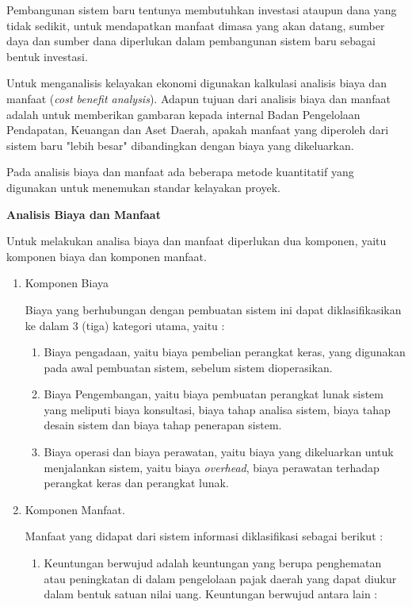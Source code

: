\documentclass[pdftex,12pt, oneside]{article}
\begin{document}
\begin{enumerate}
Pembangunan sistem baru tentunya membutuhkan investasi ataupun dana yang tidak sedikit, untuk mendapatkan manfaat dimasa yang akan datang, sumber daya dan sumber dana diperlukan dalam pembangunan sistem baru sebagai bentuk investasi.

Untuk menganalisis kelayakan ekonomi digunakan kalkulasi analisis biaya dan manfaat (\textit{cost benefit analysis}). Adapun tujuan dari analisis biaya dan manfaat adalah untuk memberikan gambaran kepada internal Badan Pengelolaan Pendapatan, Keuangan dan Aset Daerah, apakah manfaat yang diperoleh dari sistem baru "lebih besar" dibandingkan dengan biaya yang dikeluarkan. 

Pada analisis biaya dan manfaat ada beberapa metode kuantitatif yang digunakan untuk menemukan standar kelayakan proyek.

\textbf{Analisis Biaya dan Manfaat}

Untuk melakukan analisa biaya dan manfaat diperlukan dua komponen, yaitu komponen biaya dan komponen manfaat.

\begin{enumerate}
	\item Komponen Biaya
	
Biaya yang berhubungan dengan pembuatan sistem ini dapat diklasifikasikan ke dalam 3 (tiga) kategori utama, yaitu :

\begin{enumerate}
	\item Biaya pengadaan, yaitu biaya pembelian perangkat keras, yang digunakan pada awal pembuatan sistem, sebelum sistem dioperasikan.
	\item Biaya Pengembangan, yaitu biaya pembuatan perangkat lunak sistem yang meliputi biaya konsultasi, biaya tahap analisa sistem, biaya tahap desain sistem dan biaya tahap penerapan sistem.
	\item Biaya operasi dan biaya perawatan, yaitu biaya yang dikeluarkan untuk menjalankan sistem, yaitu biaya \textit{overhead}, biaya perawatan terhadap perangkat keras dan perangkat lunak.
\end{enumerate}	
	
	\item Komponen Manfaat.
	
Manfaat yang didapat dari sistem informasi diklasifikasi sebagai berikut :

\begin{enumerate}
	\item Keuntungan berwujud adalah keuntungan yang berupa penghematan atau peningkatan di dalam pengelolaan pajak daerah yang dapat diukur dalam bentuk satuan nilai uang. Keuntungan berwujud antara lain :
	

\end{enumerate}
\end{enumerate}
\end{enumerate}
\end{document}
